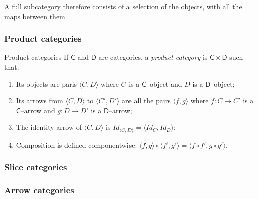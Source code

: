 A full subcategory therefore consists of a selection of the objects, 
with all the maps between them. 



\subsubsection{Product categories}

\begin{df}{Product categories}
	If $\mathsf{C}$ and $\mathsf{D}$ are categories, 
	a \textit{product category}	is $\mathsf{C} \times \mathsf{D}$ such that:
	\begin{enumerate}[itemsep=5pt,parsep=5pt,leftmargin=3em,topsep=5pt,label=(\arabic*)]
		\item 
		Its objects are paris $\langle C,D \rangle$ where $C$ is a $\mathsf{C}$--object and $D$ is a $\mathsf{D}$--object;
		
		\item
		Its arrows from $\langle C,D \rangle$ to $\langle C',D' \rangle$ are all the pairs $\langle f,g \rangle$ where $f \colon C \to C'$ is a $\mathsf{C}$--arrow and $g \colon D \to D'$ is a $\mathsf{D}$--arrow;

		\item 
		The identity arrow of $\langle C,D \rangle$ is $Id_{\langle C,D \rangle} = \langle Id_C, Id_D \rangle$;

		\item 
		Composition is defined componentwise: 
		$\langle f,g \rangle \circ \langle f', g' \rangle = \langle f\circ f', g \circ g' \rangle$.
	\end{enumerate}
\end{df}




\subsubsection{Slice categories}


\subsubsection{Arrow categories}


